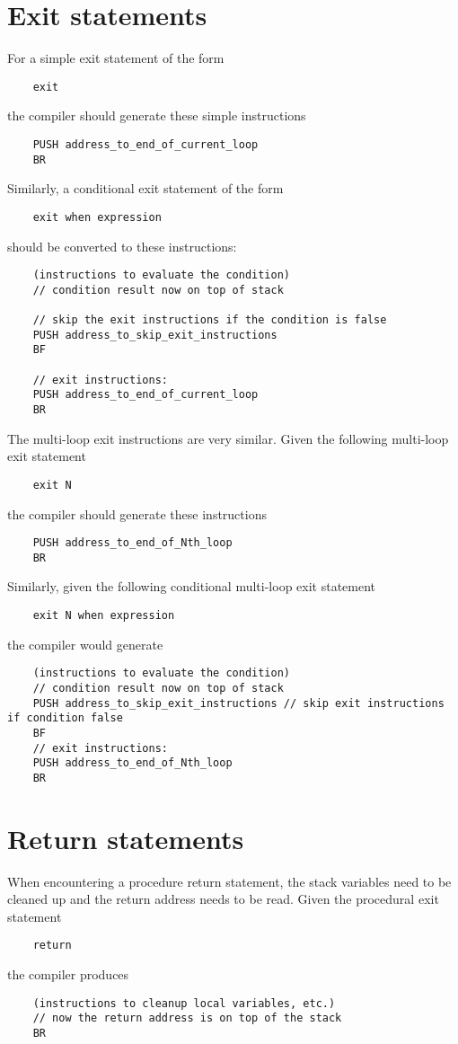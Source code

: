 \documentclass{article}
\begin{document}
\newpage
\section{Exit statements}

For a simple exit statement of the form
\begin{lstlisting}
    exit
\end{lstlisting}
the compiler should generate these simple instructions
\begin{lstlisting}
    PUSH address_to_end_of_current_loop
    BR
\end{lstlisting}

\noindent
Similarly, a conditional exit statement of the form
\begin{lstlisting}
    exit when expression
\end{lstlisting}
should be converted to these instructions:
\begin{lstlisting}
    (instructions to evaluate the condition)
    // condition result now on top of stack
    
    // skip the exit instructions if the condition is false
    PUSH address_to_skip_exit_instructions
    BF
    
    // exit instructions:
    PUSH address_to_end_of_current_loop
    BR
\end{lstlisting}

\noindent
The multi-loop exit instructions are very similar.
Given the following multi-loop exit statement
\begin{lstlisting}
    exit N
\end{lstlisting}
the compiler should generate these instructions
\begin{lstlisting}
    PUSH address_to_end_of_Nth_loop
    BR
\end{lstlisting}

\noindent
Similarly, given the following conditional multi-loop exit statement
\begin{lstlisting}
    exit N when expression
\end{lstlisting}
the compiler would generate
\begin{lstlisting}
    (instructions to evaluate the condition)
    // condition result now on top of stack
    PUSH address_to_skip_exit_instructions // skip exit instructions if condition false
    BF
    // exit instructions:
    PUSH address_to_end_of_Nth_loop
    BR
\end{lstlisting}

\section{Return statements}
When encountering a procedure return statement, the stack variables need to be cleaned up and the return address needs to be read.
\newline
Given the procedural exit statement
\begin{lstlisting}
    return
\end{lstlisting}
the compiler produces
\begin{lstlisting}
    (instructions to cleanup local variables, etc.)
    // now the return address is on top of the stack
    BR
\end{lstlisting}
\end{document}
